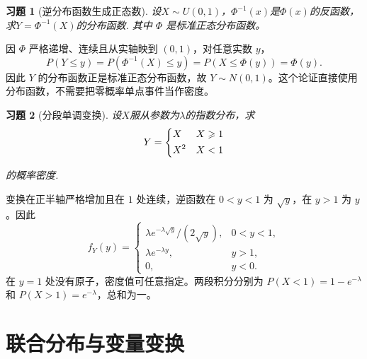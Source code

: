 \documentclass[12pt,fontset=fandol]{ctexart}
\newtheorem{exercise}{习题}[section]
\begin{document}
\begin{exercise}[逆分布函数生成正态数]\label{q:Y3.29}
设$X \sim  U(0,1)$，$\Phi^{-1}(x)$是$\Phi(x)$的反函数，求$Y=\Phi^{-1} (X)$的分布函数. 其中 $\Phi$ 是标准正态分布函数。\par{}
\end{exercise}

\begin{solve}\label{a:Y3.29}因 $\Phi$ 严格递增、连续且从实轴映到 $(0,1)$，对任意实数 $y$，\[P(Y\le y)=P(\Phi^{-1}(X)\le y)=P(X\le\Phi(y))=\Phi(y).\]因此 $Y$ 的分布函数正是标准正态分布函数，故 $Y\sim N(0,1)$。这个论证直接使用分布函数，不需要把零概率单点事件当作密度。\end{solve}

\begin{exercise}[分段单调变换]\label{q:Y3.31}
设$X$服从参数为$\lambda$的指数分布，求
\[Y = \left\{ \begin{gathered}
  X \hfill \quad X\geqslant 1\\
  {X^2} \hfill \quad  X<1\\ 
\end{gathered}  \right.\]

的概率密度.\par{}
\end{exercise}

\begin{solve}\label{a:Y3.31}变换在正半轴严格增加且在 $1$ 处连续，逆函数在 $0<y<1$ 为 $\sqrt y$，在 $y>1$ 为 $y$。因此\[f_Y(y)=\begin{cases}\lambda e^{-\lambda\sqrt y}/(2\sqrt y),&0<y<1,\\\lambda e^{-\lambda y},&y>1,\\0,&y<0.\end{cases}\]在 $y=1$ 处没有原子，密度值可任意指定。两段积分分别为 $P(X<1)=1-e^{-\lambda}$ 和 $P(X>1)=e^{-\lambda}$，总和为一。\end{solve}

\clearpage\section{联合分布与变量变换}
\end{document}
